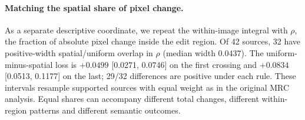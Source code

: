 \paragraph{Matching the spatial share of pixel change.} As a separate descriptive coordinate, we repeat the within-image integral with $\rho$, the fraction of absolute pixel change inside the edit region. Of 42 sources, 32 have positive-width spatial/uniform overlap in $\rho$ (median width 0.0437). The uniform-minus-spatial loss is $+0.0499$ [0.0271, 0.0746] on the first crossing and $+0.0834$ [0.0513, 0.1177] on the last; 29/32 differences are positive under each rule. These intervals resample supported sources with equal weight as in the original MRC analysis. Equal shares can accompany different total changes, different within-region patterns and different semantic outcomes.